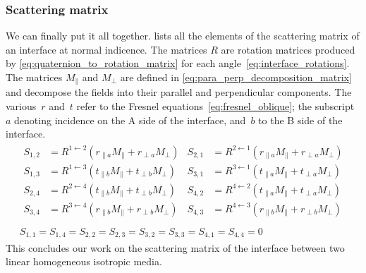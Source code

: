 \subsubsection{Scattering matrix}
We can finally put it all together.
 lists all the elements of the scattering matrix of an interface at normal indicence.
The matrices $R$ are rotation matrices produced by \cref{eq:quaternion_to_rotation_matrix} for each angle~\eqref{eq:interface_rotations}.
The matrices $M_\parallel$ and $M_\perp$ are defined in \cref{eq:para_perp_decomposition_matrix} and decompose the fields into their parallel and perpendicular components.
The various~$r$ and~$t$ refer to the Fresnel equations~\eqref{eq:fresnel_oblique}; the subscript~$a$ denoting incidence on the A side of the interface, and~$b$ to the B side of the interface.
\begin{equation}
    \begin{gathered}
    \begin{aligned}
        S_{1, 2} &= R^{1 \leftarrow 2} \left(
            r_{\parallel a} M_\parallel +
            r_{\perp a} M_\perp
        \right)
        &
        S_{2, 1} &= R^{2 \leftarrow 1} \left(
            r_{\parallel a} M_\parallel +
            r_{\perp a} M_\perp
        \right)
        \\
        S_{1, 3} &= R^{1 \leftarrow 3} \left(
            t_{\parallel b} M_\parallel +
            t_{\perp b} M_\perp
        \right)
        &
        S_{3, 1} &= R^{3 \leftarrow 1} \left(
            t_{\parallel a} M_\parallel +
            t_{\perp a} M_\perp
        \right)
        \\
        S_{2, 4} &= R^{2 \leftarrow 4} \left(
            t_{\parallel b} M_\parallel +
            t_{\perp b} M_\perp
        \right)
        &
        S_{4, 2} &= R^{4 \leftarrow 2} \left(
            t_{\parallel a} M_\parallel +
            t_{\perp a} M_\perp
        \right)
        \\
        S_{3, 4} &= R^{3 \leftarrow 4} \left(
            r_{\parallel b} M_\parallel +
            r_{\perp b} M_\perp
        \right)
        &
        S_{4, 3} &= R^{4 \leftarrow 3} \left(
            r_{\parallel b} M_\parallel +
            r_{\perp b} M_\perp
        \right)
        \\
    \end{aligned}
    \\
    S_{1, 1} = S_{1, 4} = S_{2, 2} = S_{2, 3} = S_{3, 2} = S_{3, 3} = S_{4, 1} = S_{4, 4} = 0
    \end{gathered}
    \label{eq:interface_S}
\end{equation}
This concludes our work on the scattering matrix of the interface between two linear homogeneous isotropic media.


